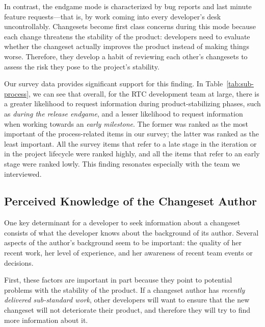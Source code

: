 In contrast, the endgame mode is characterized by bug reports and last minute feature requests---that is, by work coming into every developer's desk uncontrollably. Changesets become first class concerns during this mode because each change threatens the stability of the product: developers need to evaluate whether the changeset actually improves the product instead of making things worse. Therefore, they develop a habit of reviewing each other's changesets to assess the risk they pose to the project's stability.

Our survey data provides significant support for this finding. In Table~\ref{tab:sub-process}, we can see that overall, for the RTC development team at large, there is a greater likelihood to request information during product-stabilizing phases, such as 
\emph{during the release endgame}, and a lesser likelihood to request information when working towards an \emph{early milestone}. The former was ranked as the most important of the process-related items in our survey; the latter was ranked as the least important. All the survey items that refer to a late stage in the iteration or in the project lifecycle were ranked highly, and all the items that refer to an early stage were ranked lowly. This finding resonates especially with the team we interviewed. 




\subsection{Perceived Knowledge of the Changeset Author}

One key determinant for a developer to seek information about a changeset consists of what the developer knows about the background of its author. Several aspects of the author's background seem to be important: the quality of her recent work, her level of experience, and her awareness of recent team events or decisions.

First, these factors are important in part because they point to potential problems with the stability of the product. If a changeset author has \emph{recently delivered sub-standard work}, other developers will want to ensure that the new changeset will not deteriorate their product, and therefore they will try to find more information about it.

